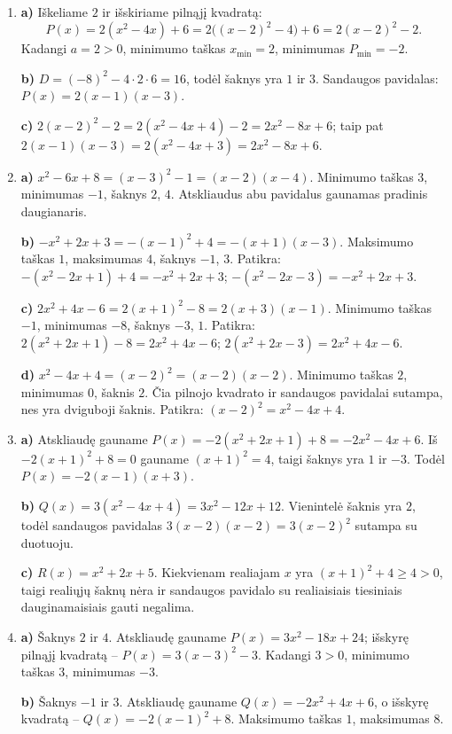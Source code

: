 \documentclass[12pt,a4paper]{article}
\begin{document}
\begin{enumerate}
\textbf{d)} Standartinis ir pilnojo kvadrato pavidalai egzistuoja visada, kai $a\ne0$. Jei realiųjų šaknų nėra, sandauga $a(x-r)(x-s)$ su realiaisiais $r$, $s$ negalima, nes įrašius $x=r$ ji būtų lygi nuliui. Tai prieštarautų šaknų nebuvimui.
\item \textbf{a)} Iškeliame $2$ ir išskiriame pilnąjį kvadratą:
\[P(x)=2(x^2-4x)+6=2\bigl((x-2)^2-4\bigr)+6=2(x-2)^2-2.\]
Kadangi $a=2>0$, minimumo taškas $x_{\min}=2$, minimumas $P_{\min}=-2$.

\textbf{b)} $D=(-8)^2-4\cdot2\cdot6=16$, todėl šaknys yra $1$ ir $3$. Sandaugos pavidalas: $P(x)=2(x-1)(x-3)$.

\textbf{c)} $2(x-2)^2-2=2(x^2-4x+4)-2=2x^2-8x+6$; taip pat $2(x-1)(x-3)=2(x^2-4x+3)=2x^2-8x+6$.
\item \textbf{a)} $x^2-6x+8=(x-3)^2-1=(x-2)(x-4)$. Minimumo taškas $3$, minimumas $-1$, šaknys $2$, $4$. Atskliaudus abu pavidalus gaunamas pradinis daugianaris.

\textbf{b)} $-x^2+2x+3=-(x-1)^2+4=-(x+1)(x-3)$. Maksimumo taškas $1$, maksimumas $4$, šaknys $-1$, $3$. Patikra: $-(x^2-2x+1)+4=-x^2+2x+3$; $-(x^2-2x-3)=-x^2+2x+3$.

\textbf{c)} $2x^2+4x-6=2(x+1)^2-8=2(x+3)(x-1)$. Minimumo taškas $-1$, minimumas $-8$, šaknys $-3$, $1$. Patikra: $2(x^2+2x+1)-8=2x^2+4x-6$; $2(x^2+2x-3)=2x^2+4x-6$.

\textbf{d)} $x^2-4x+4=(x-2)^2=(x-2)(x-2)$. Minimumo taškas $2$, minimumas $0$, šaknis $2$. Čia pilnojo kvadrato ir sandaugos pavidalai sutampa, nes yra dviguboji šaknis. Patikra: $(x-2)^2=x^2-4x+4$.
\item \textbf{a)} Atskliaudę gauname $P(x)=-2(x^2+2x+1)+8=-2x^2-4x+6$. Iš $-2(x+1)^2+8=0$ gauname $(x+1)^2=4$, taigi šaknys yra $1$ ir $-3$. Todėl $P(x)=-2(x-1)(x+3)$.

\textbf{b)} $Q(x)=3(x^2-4x+4)=3x^2-12x+12$. Vienintelė šaknis yra $2$, todėl sandaugos pavidalas $3(x-2)(x-2)=3(x-2)^2$ sutampa su duotuoju.

\textbf{c)} $R(x)=x^2+2x+5$. Kiekvienam realiajam $x$ yra $(x+1)^2+4\geq4>0$, taigi realiųjų šaknų nėra ir sandaugos pavidalo su realiaisiais tiesiniais dauginamaisiais gauti negalima.
\item \textbf{a)} Šaknys $2$ ir $4$. Atskliaudę gauname $P(x)=3x^2-18x+24$; išskyrę pilnąjį kvadratą – $P(x)=3(x-3)^2-3$. Kadangi $3>0$, minimumo taškas $3$, minimumas $-3$.

\textbf{b)} Šaknys $-1$ ir $3$. Atskliaudę gauname $Q(x)=-2x^2+4x+6$, o išskyrę kvadratą – $Q(x)=-2(x-1)^2+8$. Maksimumo taškas $1$, maksimumas $8$.


\end{enumerate}
\end{document}
